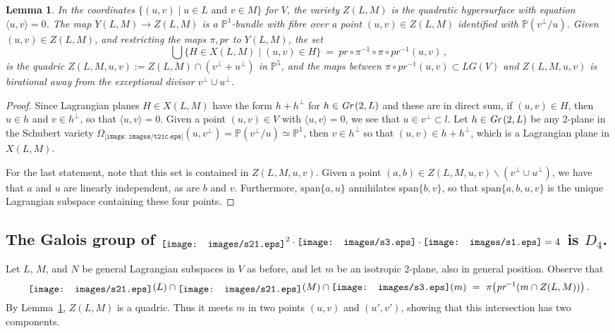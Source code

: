 \documentclass[12pt]{amsart}
\newtheorem{Lemma}[Theorem]{Lemma}
\theoremstyle{remark}
\newcommand{\Gr}{\textit{Gr\,}}
\newcommand{\LG}{\textit{LG}}
\newcommand{\pr}{\textit{pr}}
\newcommand{\Span}{\textrm{span}}
\newcommand{\PP}{{\mathbb P}}
\newcommand{\sI}{\texttt{[image: images/s1.eps]}}
\newcommand{\sTI}{\texttt{[image: images/s21.eps]}}
\newcommand{\sTh}{\texttt{[image: images/s3.eps]}}
\newcommand{\schTI}{\raisebox{-2pt}{\sTI\hspace{.5pt}}}
\newcommand{\tTIc}{\texttt{[image: images/t21c.eps]}}
\begin{document}
\begin{Lemma}
  \label{L:quadrics}
  In the coordinates $\{(u,v)\mid u\in L\mbox{ and }v\in M\}$ for $V$, the variety $Z(L,M)$ is the quadratic hypersurface with 
  equation $\langle u,v\rangle = 0$.
  The map $Y(L,M)\to Z(L,M)$ is a $\PP^1$-bundle with fibre over a point $(u,v)\in Z(L,M)$ identified with $\PP(v^\perp/u)$.
  Given $(u,v)\in Z(L,M)$, and restricting the maps $\pi,\pr$ to $Y(L,M)$, the set
  \[
     \bigcup\{ H\in X(L,M)\mid (u,v)\in H\}\ =\ \pr \circ \pi^{-1} \circ \pi \circ \pr^{-1}(u,v)\,,
   \]
  is the quadric $Z(L,M,u,v):=Z(L,M)\cap (v^\perp+u^\perp)$ in $\PP^5$, and the maps
  between $\pi \circ \pr^{-1}(u,v) \subset\LG(V)$ and $Z(L,M,u,v)$ is birational away from the exceptional divisor
  $v^\perp \cup u^\perp$.
\end{Lemma}
\begin{proof}
  Since Lagrangian planes $H\in X(L,M)$ have the form $h+h^\perp$ for $h\in\Gr(2,L)$ and these are in direct sum, if $(u,v)\in H$,
  then $u\in h$ and $v\in h^\perp$, so that $\langle u,v\rangle=0$.
  Given a point $(u,v)\in V$ with  $\langle u,v\rangle=0$, we see that $u\in v^\perp \subset l$.
  Let $h\in\Gr(2,L)$ be any 2-plane in the Schubert variety $\Omega_{\tTIc}(u,v^\perp)= \PP(v^\perp/u)\simeq\PP^1$, then
  $v\in h^\perp$ so that $(u,v)\in h+h^\perp$, which is a Lagrangian plane in $X(L,M)$.

  For the last statement, note that this set is contained in $Z(L,M,u,v)$.
  Given a point $(a,b)\in Z(L,M,u,v)\smallsetminus( v^\perp \cup u^\perp)$, we have that $a$ and $u$ are linearly independent, as are
  $b$ and $v$.
  Furthermore, $\Span\{a,u\}$ annihilates $\Span\{b,v\}$, so that $\Span\{a,b,u,v\}$ is the unique Lagrangian subspace containing these four 
  points. 
\end{proof}

\subsection{The Galois group of $\schTI^2\cdot\sTh\cdot\sI=4$ is $D_4$.}

Let $L$, $M$, and $N$ be general Lagrangian subspaces in $V$ as before, and let $m$ be an isotropic 2-plane, also in general position.
Observe that 
\[
     \schTI(L)\cap\schTI(M)\cap \sTh(m)\ =\ \pi \bigl( \pr^{-1}(m\cap Z(L,M))\bigr)\,.
\]
By Lemma~\ref{L:quadrics}, $Z(L,M)$ is a quadric.
Thus it meets $m$ in two points $(u,v)$ and $(u',v')$, showing that this intersection has two components.
\end{document}
